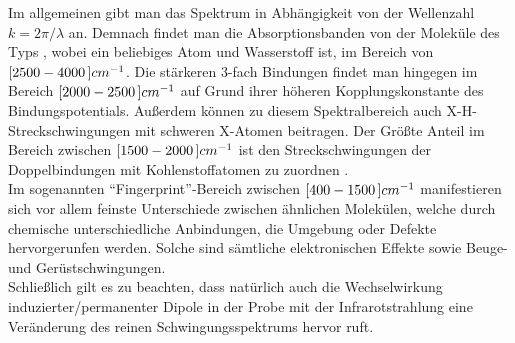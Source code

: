 Im allgemeinen gibt man das Spektrum in Abh\"angigkeit von der Wellenzahl $k=2\pi/\lambda$ an. Demnach findet man die Absorptionsbanden von  der Molek\"ule des Typs , wobei  ein beliebiges Atom und  Wasserstoff ist, im Bereich von $\unit[[2500-4000]]{cm^{-1}}$. Die st\"arkeren 3-fach Bindungen findet man hingegen im Bereich $\unit[[2000-2500]]{cm^{-1}}$ auf Grund ihrer h\"oheren Kopplungskonstante des Bindungspotentials. Au{\ss}erdem k\"onnen zu diesem Spektralbereich auch X-H-Streckschwingungen mit schweren X-Atomen beitragen. Der Gr\"o{\ss}te Anteil im Bereich zwischen $\unit[[1500-2000]]{cm^{-1}}$ ist den Streckschwingungen der Doppelbindungen mit Kohlenstoffatomen zu zuordnen .\\
Im sogenannten ``Fingerprint''-Bereich zwischen $\unit[[400-1500]]{cm^{-1}}$ manifestieren sich vor allem feinste Unterschiede zwischen \"ahnlichen Molek\"ulen, welche durch chemische unterschiedliche Anbindungen, die Umgebung oder Defekte hervorgerunfen werden. Solche sind s\"amtliche elektronischen Effekte sowie Beuge- und Ger\"ustschwingungen.\\
Schlie{\ss}lich gilt es zu beachten, dass nat\"urlich auch die Wechselwirkung induzierter/permanenter Dipole in der Probe mit der Infrarotstrahlung eine Ver\"anderung des reinen Schwingungsspektrums hervor ruft.